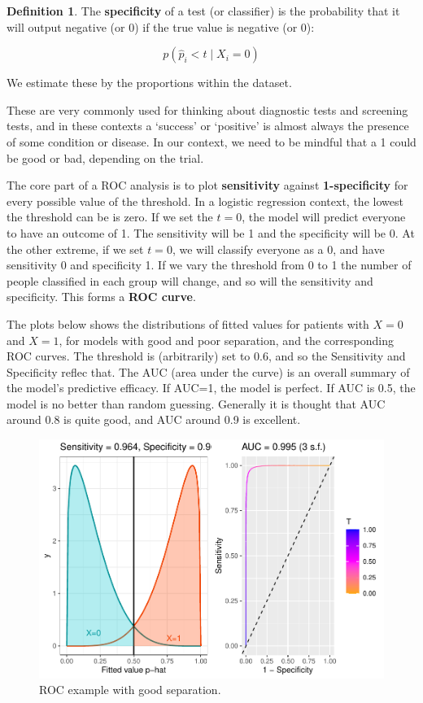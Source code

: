 \documentclass[
  openany]{book}
\theoremstyle{definition}
\newtheorem{definition}{Definition}[chapter]
\theoremstyle{definition}
\theoremstyle{definition}
\theoremstyle{definition}
\theoremstyle{remark}
\begin{document}
\begin{definition}
The \textbf{specificity} of a test (or classifier) is the probability that it will output negative (or 0) if the true value is negative (or 0):

\[p\left(\hat{p}_i < t \mid{X_i=0}\right) \]
\end{definition}

We estimate these by the proportions within the dataset.

These are very commonly used for thinking about diagnostic tests and screening tests, and in these contexts a `success' or `positive' is almost always the presence of some condition or disease. In our context, we need to be mindful that a 1 could be good or bad, depending on the trial.

The core part of a ROC analysis is to plot \textbf{sensitivity} against \textbf{1-specificity} for every possible value of the threshold. In a logistic regression context, the lowest the threshold can be is zero. If we set the \(t=0\), the model will predict everyone to have an outcome of 1. The sensitivity will be 1 and the specificity will be 0. At the other extreme, if we set \(t=0\), we will classify everyone as a 0, and have sensitivity 0 and specificity 1. If we vary the threshold from 0 to 1 the number of people classified in each group will change, and so will the sensitivity and specificity. This forms a \textbf{ROC curve}.

The plots below shows the distributions of fitted values for patients with \(X=0\) and \(X=1\), for models with good and poor separation, and the corresponding ROC curves. The threshold is (arbitrarily) set to 0.6, and so the Sensitivity and Specificity reflec that. The AUC (area under the curve) is an overall summary of the model's predictive efficacy. If AUC=1, the model is perfect. If AUC is 0.5, the model is no better than random guessing. Generally it is thought that AUC around 0.8 is quite good, and AUC around 0.9 is excellent.

\begin{figure}
\centering
\includegraphics{CT4H_notes_files/figure-latex/rocgood-1.pdf}
\caption{\label{fig:rocgood}ROC example with good separation.}
\end{figure}
\end{document}
